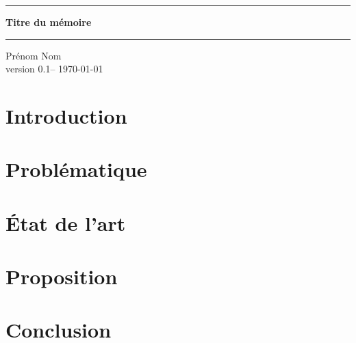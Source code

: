 \documentclass[12pt,a4wide]{report}
\def\TitreMemoire{Titre du mémoire}
\def\AuteurMemoire{Prénom Nom}
\def\VersionMemoire{0.1}
\def\DateMemoire{\today}
\begin{document}
\thispagestyle{empty}
\begin{center}
\vspace{2cm}
\hrule
\vspace{.5cm}
{\Huge\textbf{\TitreMemoire}}\\
\vspace{.5cm}
\hrule
\vspace{1cm}
{\Large \AuteurMemoire}\\
\vfill
{version \VersionMemoire -- \DateMemoire}
\vspace{2cm}
\end{center}
\newpage

\tableofcontents
\newpage

\chapter{Introduction}


\chapter{Problématique}


\chapter{\'Etat de l'art}


\chapter{Proposition}


\chapter{Conclusion}

\end{document}
